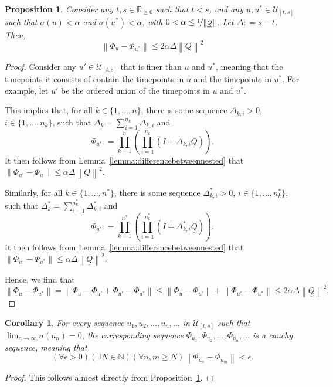 \documentclass[10pt]{paper}
\newtheorem{proposition}[theorem]{Proposition}
\newtheorem{corollary}[theorem]{Corollary}
\newcommand{\nats}{\mathbb{N}}
\newcommand{\reals}{\mathbb{R}}
\newcommand{\realsnonneg}{\reals_{\geq 0}}
\newcommand{\lrate}{\underline{Q}}
\newcommand{\norm}[1]{\left\lVert #1 \right\rVert}
\newcommand{\coloneqq}{:\!=}
\begin{document}
\begin{proposition}\label{prop:differencebetweenu}
Consider any $t,s\in\realsnonneg$ such that $t<s$, and any $u,u^*\in\mathcal{U}_{[t,s]}$ such that $\sigma(u)<\alpha$ and $\sigma(u^*)<\alpha$, with $0<\alpha\leq\nicefrac{1}{\norm{\lrate}}$. Let $\Delta\coloneqq s-t$. Then,
\begin{equation*}
\norm{\Phi_u-\Phi_{u^*}}\leq 2\alpha\Delta\norm{\lrate}^2
\end{equation*}
\end{proposition}
\begin{proof}
Consider any $u'\in\mathcal{U}_{[t,s]}$ that is finer than $u$ and $u^*$, meaning that the timepoints it consists of contain the timepoints in $u$ and the timepoints in $u^*$. For example, let $u'$ be the ordered union of the timepoints in $u$ and $u^*$.

This implies that, for all $k\in\{1,\dots,n\}$, there is some sequence $\Delta_{k,i}>0$, $i\in\{1,\dots,n_k\}$, such that $\Delta_k=\sum_{i=1}^{n_k}\Delta_{k,i}$ and
\begin{equation*}
\Phi_{u'}\coloneqq\prod_{k=1}^n\left(\prod_{i=1}^{n_k}(I+\Delta_{k,i}\lrate)\right).
\end{equation*}
It then follows from Lemma~\ref{lemma:differencebetweennested} that $\norm{\Phi_{u'}-\Phi_u}\leq\alpha\Delta\norm{\lrate}^2$. 

Similarly, for all $k\in\{1,\dots,n^*\}$, there is some sequence $\Delta^*_{k,i}>0$, $i\in\{1,\dots,n^*_k\}$, such that $\Delta^*_k=\sum_{i=1}^{n^*_k}\Delta^*_{k,i}$ and
\begin{equation*}
\Phi_{u'}\coloneqq\prod_{k=1}^{n^*}\left(\prod_{i=1}^{n^*_k}(I+\Delta^*_{k,i}\lrate)\right).
\end{equation*}
It then follows from Lemma~\ref{lemma:differencebetweennested} that $\norm{\Phi_{u'}-\Phi_{u^*}}\leq\alpha\Delta\norm{\lrate}^2$.

Hence, we find that
\begin{equation*}
\norm{\Phi_{u}-\Phi_{u^*}}
=
\norm{\Phi_{u}-\Phi_{u'}+\Phi_{u'}-\Phi_{u^*}}
\leq
\norm{\Phi_{u}-\Phi_{u'}}
+
\norm{\Phi_{u'}-\Phi_{u^*}}
\leq2\alpha\Delta\norm{\lrate}^2.
\end{equation*}
\end{proof}

\begin{corollary}\label{corol:cauchy}
For every sequence $u_1,u_2,\dots,u_n,\dots$ in $\mathcal{U}_{[t,s]}$ such that $\lim_{n\to\infty}\sigma(u_n)=0$, the corresponding sequence $\Phi_{u_1},\Phi_{u_2},\dots,\Phi_{u_n},\dots$ is a \emph{cauchy sequence}, meaning that
\begin{equation*}
(\forall \epsilon>0)(\exists N\in\nats)(\forall n,m\geq N)
\norm{\Phi_{u_n}-\Phi_{u_m}}<\epsilon.
\end{equation*}
\end{corollary}
\begin{proof}
This follows almost directly from Proposition~\ref{prop:differencebetweenu}.
\end{proof}
\end{document}
